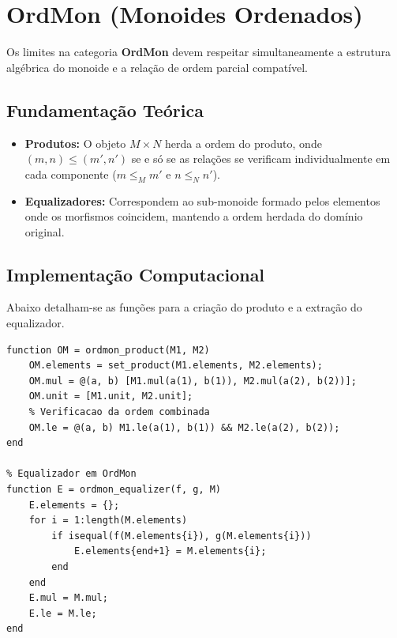 \section{OrdMon (Monoides Ordenados)}

Os limites na categoria \textbf{OrdMon} devem respeitar simultaneamente a estrutura algébrica do monoide e a relação de ordem parcial compatível.

\subsection{Fundamentação Teórica}
\begin{itemize}
    \item \textbf{Produtos:} O objeto $M \times N$ herda a ordem do produto, onde $(m, n) \le (m', n')$ se e só se as relações se verificam individualmente em cada componente ($m \le_M m'$ e $n \le_N n'$).
    \item \textbf{Equalizadores:} Correspondem ao sub-monoide formado pelos elementos onde os morfismos coincidem, mantendo a ordem herdada do domínio original.
\end{itemize}

\subsection{Implementação Computacional}
Abaixo detalham-se as funções para a criação do produto e a extração do equalizador.

\begin{lstlisting}[caption={Construções em Monoides Ordenados}]
% Produto em OrdMon
function OM = ordmon_product(M1, M2)
    OM.elements = set_product(M1.elements, M2.elements);
    OM.mul = @(a, b) [M1.mul(a(1), b(1)), M2.mul(a(2), b(2))];
    OM.unit = [M1.unit, M2.unit];
    % Verificacao da ordem combinada
    OM.le = @(a, b) M1.le(a(1), b(1)) && M2.le(a(2), b(2));
end

% Equalizador em OrdMon
function E = ordmon_equalizer(f, g, M)
    E.elements = {};
    for i = 1:length(M.elements)
        if isequal(f(M.elements{i}), g(M.elements{i}))
            E.elements{end+1} = M.elements{i};
        end
    end
    E.mul = M.mul;
    E.le = M.le;
end
\end{lstlisting}